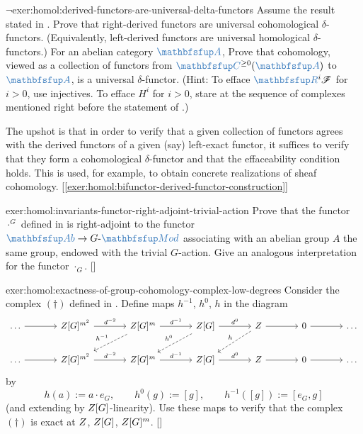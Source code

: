 \begin{exer}{$\lnot$}{exer:homol:derived-functors-are-universal-delta-functors}
  Assume the result stated in
  . Prove
  that right-derived functors are universal cohomological
  $\delta$-functors. (Equivalently, left-derived functors are
  universal homological $\delta$-functors.) For an abelian category
  $\categ{A}$, Prove that cohomology, viewed as a collection of
  functors from $\categ{C}^{\ge 0}(\categ{A})$ to $\categ{A}$, is a
  universal $\delta$-functor. (Hint: To efface
  $\categ{R}^i\mathscr{F}$ for $i > 0$, use injectives. To efface
  $H^i$ for $i > 0$, stare at the sequence of complexes mentioned
  right before the statement of .)

  The upshot is that in order to verify that a given collection of
  functors agrees with the derived functors of a given (say)
  left-exact functor, it suffices to verify that they form a
  cohomological $\delta$-functor and that the effaceability condition
  holds. This is used, for example, to obtain concrete realizations of
  sheaf
  cohomology. [\ref{exer:homol:bifunctor-derived-functor-construction}]
\end{exer}
\begin{exer}{\exerused{}}{exer:homol:invariants-functor-right-adjoint-trivial-action}
  Prove that the functor $\cdot^G$ defined in
   is
  right-adjoint to the functor $\categ{Ab} \to G\text{-}\categ{Mod}$
  associating with an abelian group $A$ the same group, endowed with
  the trivial $G$-action. Give an analogous interpretation for the
  functor
  $\cdot_G$. []
\end{exer}
\begin{exer}{\exerused{}}{exer:homol:exactness-of-group-cohomology-complex-low-degrees}
  Consider the complex $(\dagger)$ defined in
  . Define
  maps $h^{-1}$, $h^0$, $h$ in the diagram
  \[\begin{tikzcd}[column sep=large]
      \dots \arrow[r] & \Z[G]^{m^2} \arrow[r, "d^{-2}"] & \Z[G]^m
      \arrow[r, "d^{-1}"] \arrow[dl, dashed, "h^{-1}"'] & \Z[G]
      \arrow[r, "d^0"] \arrow[dl, dashed, "h^0"'] & \Z \arrow[r]
      \arrow[dl, dashed, "h"'] & 0 \arrow[r] & \dots \\
      \dots \arrow[r] & \Z[G]^{m^2} \arrow[r, "d^{-2}"] & \Z[G]^m
      \arrow[r, "d^{-1}"] & \Z[G] \arrow[r, "d^0"] & \Z \arrow[r] & 0
      \arrow[r] & \dots
    \end{tikzcd}\] by
  \[
    h(a) := a \cdot e_G, \qquad h^0(g) := [g], \qquad h^{-1}([g]) :=
    [e_G, g]
  \]
  (and extending by $Z[G]$-linearity). Use these maps to verify that
  the complex $(\dagger)$ is exact at $Z$, $Z[G]$,
  $Z[G]^m$. []
\end{exer}

